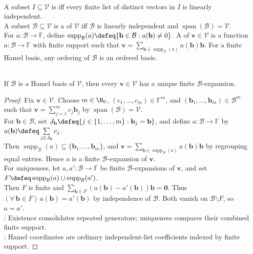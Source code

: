 \begin{definition} \label{def:hamel-basis} \\
A subset $I\subseteq\mathcal{V}$ is  iff every finite list of distinct vectors in $I$ is linearly independent.\\
A subset $\mathcal{B}\subseteq\mathcal{V}$ is a  of $\mathcal{V}$ iff $\mathcal{B}$ is linearly independent and $\operatorname{span}(\mathcal{B})=\mathcal{V}$.\\
For $a:\mathcal{B}\to\mathbb{F}$, define $\operatorname{supp}_{\mathcal{B}}(a)\defeq\{\mathbf{b}\in\mathcal{B}:a(\mathbf{b})\neq0\}$. A  of $\mathbf{v}\in\mathcal{V}$ is a function $a:\mathcal{B}\to\mathbb{F}$ with finite support such that $\mathbf{v}=\sum\limits_{\mathbf{b}\in\operatorname{supp}_{\mathcal{B}}(a)}a(\mathbf{b})\mathbf{b}$. For a finite Hamel basis, any ordering of $\mathcal{B}$ is an ordered basis.
\end{definition}

\begin{proposition} \label{prop:hamel-coordinate-representation} \\
If $\mathcal{B}$ is a Hamel basis of $\mathcal{V}$, then every $\mathbf{v}\in\mathcal{V}$ has a unique finite $\mathcal{B}$-expansion.
\begin{proof}
Fix $\mathbf{v}\in\mathcal{V}$. Choose $m\in\N_0$, $(c_1,\ldots,c_m)\in\mathbb{F}^m$, and $(\mathbf{b}_1,\ldots,\mathbf{b}_m)\in\mathcal{B}^m$ such that $\mathbf{v}=\sum\limits_{j=1}^{m}c_j\mathbf{b}_j$ by $\operatorname{span}(\mathcal{B})=\mathcal{V}$.\\
For $\mathbf{b}\in\mathcal{B}$, set $J_{\mathbf{b}}\defeq\{j\in\{1,\ldots,m\}:\mathbf{b}_j=\mathbf{b}\}$, and define $a:\mathcal{B}\to\mathbb{F}$ by $a(\mathbf{b})\defeq\sum\limits_{j\in J_{\mathbf{b}}}c_j$.\\
Then $\operatorname{supp}_{\mathcal{B}}(a)\subseteq\{\mathbf{b}_1,\ldots,\mathbf{b}_m\}$, and $\mathbf{v}=\sum\limits_{\mathbf{b}\in\operatorname{supp}_{\mathcal{B}}(a)}a(\mathbf{b})\mathbf{b}$ by regrouping equal entries. Hence $a$ is a finite $\mathcal{B}$-expansion of $\mathbf{v}$.\\
For uniqueness, let $a,a':\mathcal{B}\to\mathbb{F}$ be finite $\mathcal{B}$-expansions of $\mathbf{v}$, and set $F\defeq\operatorname{supp}_{\mathcal{B}}(a)\cup\operatorname{supp}_{\mathcal{B}}(a')$.\\
Then $F$ is finite and $\sum\limits_{\mathbf{b}\in F}(a(\mathbf{b})-a'(\mathbf{b}))\mathbf{b}=\mathbf{0}$. Thus $(\forall\,\mathbf{b}\in F)\,a(\mathbf{b})=a'(\mathbf{b})$ by independence of $\mathcal{B}$. Both vanish on $\mathcal{B}\setminus F$, so $a=a'$.\\
: Existence consolidates repeated generators; uniqueness compares their combined finite support.\\
: Hamel coordinates are ordinary independent-list coefficients indexed by finite support.
\end{proof}
\end{proposition}

